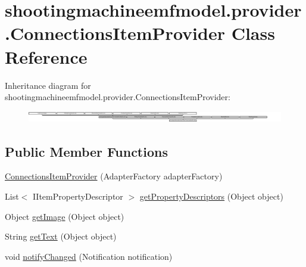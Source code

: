 \hypertarget{classshootingmachineemfmodel_1_1provider_1_1_connections_item_provider}{\section{shootingmachineemfmodel.\-provider.\-Connections\-Item\-Provider Class Reference}
\label{classshootingmachineemfmodel_1_1provider_1_1_connections_item_provider}
}
Inheritance diagram for shootingmachineemfmodel.\-provider.\-Connections\-Item\-Provider\-:\begin{figure}[H]
\begin{center}
\leavevmode
\includegraphics[height=0.499109cm]{classshootingmachineemfmodel_1_1provider_1_1_connections_item_provider}
\end{center}
\end{figure}
\subsection*{Public Member Functions}
\begin{DoxyCompactItemize}
\item 
\hyperlink{classshootingmachineemfmodel_1_1provider_1_1_connections_item_provider_ad29c2a14df0b1cf1c7e0b20f5dde0a9e}{Connections\-Item\-Provider} (Adapter\-Factory adapter\-Factory)
\item 
List$<$ I\-Item\-Property\-Descriptor $>$ \hyperlink{classshootingmachineemfmodel_1_1provider_1_1_connections_item_provider_ad4b75b8b5465991920dcfc2ba4c0fc1d}{get\-Property\-Descriptors} (Object object)
\item 
Object \hyperlink{classshootingmachineemfmodel_1_1provider_1_1_connections_item_provider_a8446906e3729c2d7405bbf7aaa14df16}{get\-Image} (Object object)
\item 
String \hyperlink{classshootingmachineemfmodel_1_1provider_1_1_connections_item_provider_a02527016fc197c38a6ede1114c57abc8}{get\-Text} (Object object)
\item 
void \hyperlink{classshootingmachineemfmodel_1_1provider_1_1_connections_item_provider_a02abb863b017211dc4a98758cf247eba}{notify\-Changed} (Notification notification)
\end{DoxyCompactItemize}
